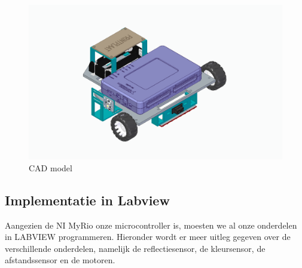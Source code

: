 \documentclass[kulak]{kulakarticle} %
\begin{document}
\begin{figure}[h]
	\centering
	\includegraphics[width=\textwidth]{FotoChassisVerslag (2)}
	\caption{CAD model}
	\label{fig:chassis2}
\end{figure}

\subsection{Implementatie in Labview}
Aangezien de NI MyRio onze microcontroller is, moesten we al onze onderdelen in LABVIEW programmeren. Hieronder wordt er meer uitleg gegeven over de verschillende onderdelen, namelijk de reflectiesensor, de kleursensor, de afstandssensor en de motoren.
\end{document}
